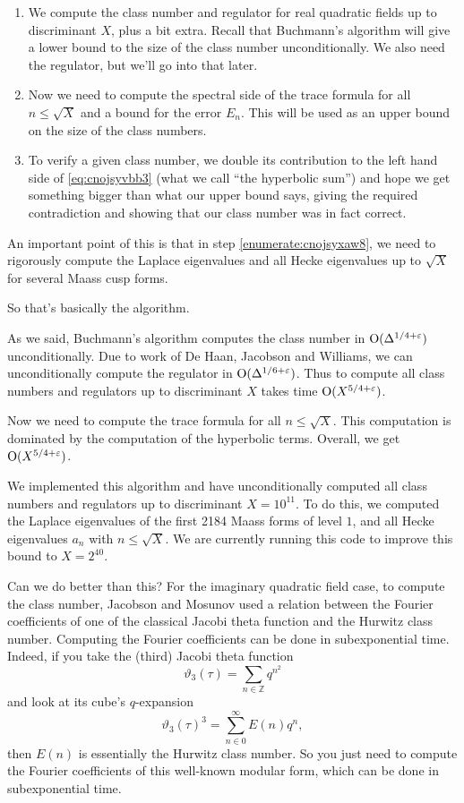 \documentclass[reqno]{amsart} 
\begin{document}
\begin{enumerate}
\item We compute the class number and regulator for real quadratic fields up to discriminant $X$, plus a bit extra.  Recall that Buchmann's algorithm will give a lower bound to the size of the class number unconditionally.  We also need the regulator, but we'll go into that later.
\item\label{enumerate:cnojsyxaw8} Now we need to compute the spectral side of the trace formula for all $n \leq \sqrt{X}$ and a bound for the error $E_n$.  This will be used as an upper bound on the size of the class numbers.
\item To verify a given class number, we double its contribution to the left hand side of  \eqref{eq:cnojsyvbb3} (what we call ``the hyperbolic sum'') and hope we get something bigger than what our upper bound says, giving the required contradiction and showing that our class number was in fact correct.
\end{enumerate}
An important point of this is that in step \eqref{enumerate:cnojsyxaw8}, we need to rigorously compute the Laplace eigenvalues and all Hecke eigenvalues up to $\sqrt{X}$ for several Maass cusp forms.

So that's basically the algorithm.

As we said, Buchmann's algorithm computes the class number in $\operatorname{O}(\Delta^{1/4 + \varepsilon})$ unconditionally.  Due to work of De Haan, Jacobson and Williams, we can unconditionally compute the regulator in $\operatorname{O}(\Delta^{1/6 + \varepsilon})$.  Thus to compute all class numbers and regulators up to discriminant $X$ takes time $\operatorname{O}(X^{5/4 + \varepsilon})$.

Now we need to compute the trace formula for all $n \leq \sqrt{X}$.  This computation is dominated by the computation of the hyperbolic terms.  Overall, we get $\operatorname{O}(X^{5/4 + \varepsilon})$.

We implemented this algorithm and have unconditionally computed all class numbers and regulators up to discriminant $X = 10^{11}$.  To do this, we computed the Laplace eigenvalues of the first 2184 Maass forms of level $1$, and all Hecke eigenvalues $a_n$ with $n \leq \sqrt{X}$.  We are currently running this code to improve this bound to $X = 2^{40}$.

Can we do better than this?  For the imaginary quadratic field case, to compute the class number, Jacobson and Mosunov used a relation between the Fourier coefficients of one of the classical Jacobi theta function and the Hurwitz class number.  Computing the Fourier coefficients can be done in subexponential time.  Indeed, if you take the (third) Jacobi theta function
\begin{equation*}
  \vartheta_3(\tau) = \sum_{n \in \mathbb{Z}} q^{n^2}
\end{equation*}
and look at its cube's $q$-expansion
\begin{equation*}
  \vartheta_3(\tau)^3 = \sum_{n \in 0}^\infty E(n) q^n,
\end{equation*}
then $E(n)$ is essentially the Hurwitz class number.  So you just need to compute the Fourier coefficients of this well-known modular form, which can be done in subexponential time.
\end{document}
